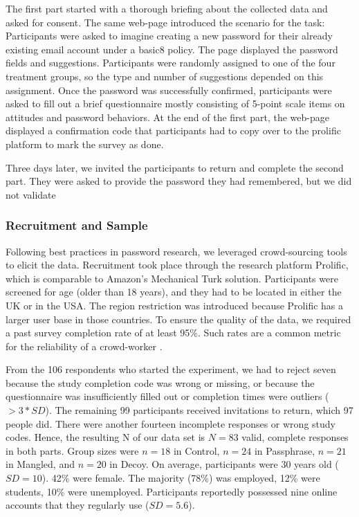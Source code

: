 The first part started with a thorough briefing about the collected data and asked for consent. The same web-page introduced the scenario for the task: Participants were asked to imagine creating a new password for their already existing email account under a basic8 policy. The page displayed the password fields and suggestions. Participants were randomly assigned to one of the four treatment groups, so the type and number of suggestions depended on this assignment. Once the password was successfully confirmed, participants were asked to fill out a brief questionnaire mostly consisting of 5-point scale items on attitudes and password behaviors. At the end of the first part, the web-page displayed a confirmation code that participants had to copy over to the prolific platform to mark the survey as done. 

Three days later, we invited the participants to return and complete the second part. They were asked to provide the password they had remembered, but we did not validate 

\subsubsection{Recruitment and Sample}
Following best practices in password research, we leveraged crowd-sourcing tools to elicit the data. Recruitment took place through the research platform Prolific, which is comparable to Amazon's Mechanical Turk solution. Participants were screened for age (older than 18 years), and they had to be located in either the UK or in the USA. The region restriction was introduced because Prolific has a larger user base in those countries. To ensure the quality of the data, we required a past survey completion rate of at least 95\%. Such rates are a common metric for the reliability of a crowd-worker \cite{Ross2010WhoAreTurkers}. 

From the 106 respondents who started the experiment, we had to reject seven because the study completion code was wrong or missing, or because the questionnaire was insufficiently filled out or completion times were outliers ($> 3*SD$). The remaining 99 participants received invitations to return, which 97 people did. There were another fourteen incomplete responses or wrong study codes. Hence, the resulting N of our data set is $N = 83$ valid, complete responses in both parts. Group sizes were $n=18$ in Control, $n=24$ in Passphrase, $n=21$ in Mangled, and $n=20$ in Decoy. On average, participants were 30 years old ($SD=10$). 42\% were female. The majority (78\%) was employed, 12\% were students, 10\% were unemployed. Participants reportedly possessed nine online accounts that they regularly use ($SD=5.6$). 

